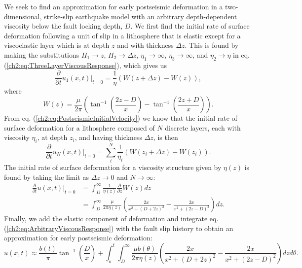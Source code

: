 We seek to find an approximation for early postseismic deformation in
a two-dimensional, strike-slip earthquake model with an arbitrary
depth-dependent viscosity below the fault locking depth, $D$.  We
first find the initial rate of surface deformation following a unit of
slip in a lithosphere that is elastic except for a viscoelastic layer
which is at depth $z$ and with thickness $\Delta z$. This is found by
making the substitutions $H_1 \to z$, $H_2 \to \Delta z$, $\eta_1 \to
\infty$, $\eta_3 \to \infty$, and $\eta_2 \to \eta$ in eq.
(\ref{ch2:eq:ThreeLayerViscousResponse}), which gives us
\begin{equation}
\frac{\partial}{\partial t}u_1(x,t)\big|_{t=0} = 
\frac{1}{\eta}(W(z+\Delta z) - W(z)),
\end{equation}
where
\begin{equation}
W(z) = \frac{\mu}{2\pi}\left(\tan^{-1}\left(\frac{2z-D}{x}\right) -
       \tan^{-1}\left(\frac{2z+D}{x}\right)\right).
\end{equation}
From eq. (\ref{ch2:eq:PostseismicInitialVelocity}) we know that the
initial rate of surface deformation for a lithosphere composed of $N$
discrete layers, each with viscosity $\eta_i$, at depth $z_i$, and
having thickness $\Delta z$, is then
\begin{equation}
\frac{\partial}{\partial t}u_N(x,t)\big|_{t=0} = 
\sum_i^N \frac{1}{\eta_i}(W(z_i + \Delta z) - W(z_i)).
\end{equation}
The initial rate of surface deformation for a viscosity structure
given by $\eta(z)$ is found by taking the limit as $\Delta z \to 0$
and $N \to \infty$:
\begin{align}\label{ch2:eq:ArbitraryViscousResponse}
\frac{\partial}{\partial t}u(x,t)\big|_{t=0} 
&= \int_D^\infty \frac{1}{\eta(z)}\frac{\partial}{\partial z} W(z) dz\\
&= \int_D^{\infty}\frac{\mu}{2\pi\eta(z)}\left(\frac{2x}{x^2 + \left(D + 2z\right)^2} -
   \frac{2x}{x^2 + \left(2z - D\right)^2}\right) dz.
\end{align}
Finally, we add the elastic component of deformation and integrate eq.
(\ref{ch2:eq:ArbitraryViscousResponse}) with the fault slip history to
obtain an approximation for early postseismic deformation:
\begin{equation}
u(x,t) \approx 
\frac{b(t)}{\pi}\tan^{-1}(\frac{D}{x}) + 
\int_o^t\int_D^\infty \frac{\mu b(\theta)}{2\pi\eta(z)}
                      \left(\frac{2x}{x^2 + \left(D + 2z\right)^2} - 
                      \frac{2x}{x^2 + \left(2z - D\right)^2}\right)
                      dz d\theta.
\end{equation}
